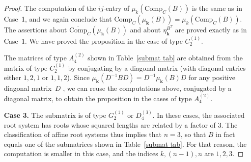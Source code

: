 \documentclass{amsart}
\theoremstyle{definition}
\theoremstyle{remark}
\numberwithin{equation}{section}
\newcommand{\0}{{\mathbf{0}}}
\newcommand{\Comp}{\mathrm{Comp}_C}
\newcommand{\CompPlus}{\overline{\mathrm{Comp}}_C}
\newcommand{\kk}{{\boldsymbol{k}}}
\begin{document}
\begin{proof}
The computation of the $ij$-entry of $\mu_k(\Comp(B))$ is the same as in Case~1, and we again conclude that $\Comp(\mu_\kk(B))=\mu_k(\Comp(B))$.
The assertions about $\CompPlus(\mu_\kk(B))$ and about $\eta^{B^T}_\kk$ are proved exactly as in Case~1.
We have proved the proposition in the case of type $C_2^{(1)}$.

The matrices of type $A_4^{(2)}$ shown in Table~\ref{submat tab} are obtained from the matrix of type $C_2^{(1)}$ by conjugating by a diagonal matrix (with diagonal entries either $1,2,1$ or $1,1,2$).
Since $\mu_\kk(D^{-1}BD)=D^{-1}\mu_\kk(B)D$ for any positive diagonal matrix~$D$ \cite[Proposition~4.5]{ca1}, we can reuse the computations above, conjugated by a diagonal matrix, to obtain the proposition in the cases of type $A_4^{(2)}$.

\medskip

\noindent
\textbf{Case 3.}
The submatrix is of type  $G_2^{(1)}$ or $D_4^{(3)}$.
In these cases, the associated root system has roots whose squared lengths are related by a factor of $3$.
The classification of affine root systems thus implies that $n=3$, so that $B$ in fact equals one of the submatrices shown in Table~\ref{submat tab}.
For that reason, the computation is smaller in this case, and the indices $k,(n-1),n$ are $1,2,3$.


\end{proof}
\end{document}
